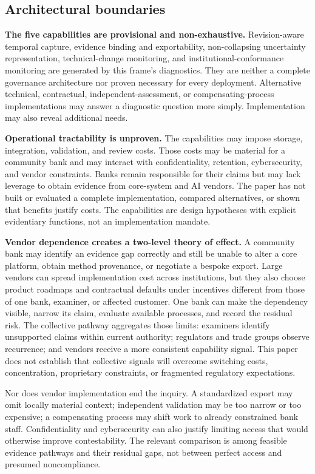 \subsection{Architectural boundaries}

\textbf{The five capabilities are provisional and non-exhaustive.}
Revision-aware temporal capture, evidence binding and exportability,
non-collapsing uncertainty representation, technical-change monitoring, and
institutional-conformance monitoring are generated by this frame's diagnostics.
They are neither a complete governance architecture nor proven necessary for
every deployment. Alternative technical, contractual, independent-assessment,
or compensating-process implementations may answer a diagnostic question more
simply. Implementation may also reveal additional needs.

\textbf{Operational tractability is unproven.} The capabilities may impose storage,
integration, validation, and review costs. Those costs may be material for a
community bank and may interact with confidentiality, retention, cybersecurity,
and vendor constraints. Banks remain responsible for their claims but may lack
leverage to obtain evidence from core-system and AI vendors. The paper has not
built or evaluated a complete implementation, compared alternatives, or shown
that benefits justify costs. The capabilities are design hypotheses with
explicit evidentiary functions, not an implementation mandate.

\textbf{Vendor dependence creates a two-level theory of effect.} A community bank may
identify an evidence gap correctly and still be unable to alter a core platform,
obtain method provenance, or negotiate a bespoke export. Large vendors can
spread implementation cost across institutions, but they also choose product
roadmaps and contractual defaults under incentives different from those of one
bank, examiner, or affected customer. One bank can make the dependency visible,
narrow its claim, evaluate available processes, and record the residual risk.
The collective pathway aggregates those limits: examiners identify unsupported
claims within current authority; regulators and trade groups observe recurrence;
and vendors receive a more consistent capability signal. This paper does not
establish that collective signals will overcome switching costs, concentration,
proprietary constraints, or fragmented regulatory expectations.

Nor does vendor implementation end the inquiry. A standardized export may omit
locally material context; independent validation may be too narrow or too
expensive; a compensating process may shift work to already constrained bank
staff. Confidentiality and cybersecurity can also justify limiting access that
would otherwise improve contestability. The relevant comparison is among
feasible evidence pathways and their residual gaps, not between perfect access
and presumed noncompliance.


